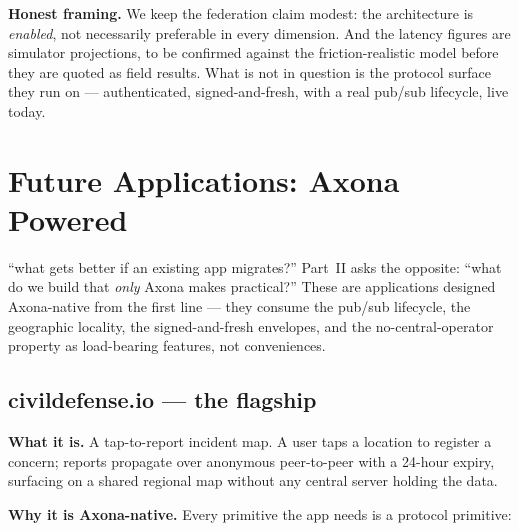 \documentclass[nobib]{tufte-handout}
\begin{document}
\textbf{Honest framing.} We keep the federation claim modest: the
architecture is \emph{enabled}, not necessarily preferable in every
dimension. And the latency figures are simulator projections, to be
confirmed against the friction-realistic model before they are quoted as
field results. What is not in question is the protocol surface they run
on --- authenticated, signed-and-fresh, with a real pub/sub lifecycle,
live today.


\section{Future Applications: Axona Powered}

 ``what gets better if an existing app
migrates?'' Part~II asks the opposite: ``what do we build that
\emph{only} Axona makes practical?'' These are applications designed
Axona-native from the first line --- they consume the pub/sub lifecycle,
the geographic locality, the signed-and-fresh envelopes, and the
no-central-operator property as load-bearing features, not
conveniences.

\subsection{civildefense.io --- the flagship}

\textbf{What it is.} A tap-to-report incident map. A user taps a
location to register a concern; reports propagate over anonymous
peer-to-peer with a 24-hour expiry, surfacing on a shared regional map
without any central server holding the data.

\textbf{Why it is Axona-native.} Every primitive the app needs is a
protocol primitive:
\end{document}
